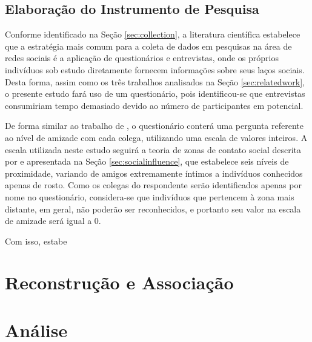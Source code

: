 \subsection{Elaboração do Instrumento de Pesquisa} \label{sec:surveydesign}

Conforme identificado na Seção \ref{sec:collection}, a literatura científica estabelece que a estratégia mais comum para a coleta de dados em pesquisas na área de redes sociais é a aplicação de questionários e entrevistas, onde os próprios indivíduos sob estudo diretamente fornecem informações sobre seus laços sociais. Desta forma, assim como os três trabalhos analisados na Seção \ref{sec:relatedwork}, o presente estudo fará uso de um questionário, pois identificou-se que entrevistas consumiriam tempo demasiado devido ao número de participantes em potencial.

De forma similar ao trabalho de , o questionário conterá uma pergunta referente ao nível de amizade com cada colega, utilizando uma escala de valores inteiros. A escala utilizada neste estudo seguirá a teoria de zonas de contato social descrita por  e apresentada na Seção \ref{sec:socialinfluence}, que estabelece seis níveis de proximidade, variando de amigos extremamente íntimos a indivíduos conhecidos apenas de rosto. Como os colegas do respondente serão identificados apenas por nome no questionário, considera-se que indivíduos que pertencem à zona mais distante, em geral, não poderão ser reconhecidos, e portanto seu valor na escala de amizade será igual a 0.

Com isso, estabe

\section{Reconstrução e Associação} \label{sec:reconstruction}
\section{Análise} \label{sec:analysiscollected}




